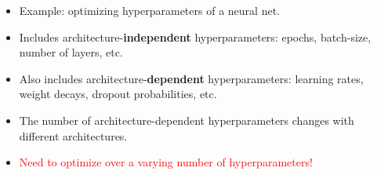 \documentclass[landscape,a0b,final,a4resizeable]{include/a0poster}
\begin{document}
\begin{poster}
\vspace*{4cm}

\large




\begin{multicols}{3}
%

\vspace{0.5in}

\begin{minipage}[c]{0.17\textwidth}
\begin{itemize}
	\item Example: optimizing hyperparameters of a neural net.
	\item Includes architecture-\textbf{independent} hyperparameters: epochs, batch-size, number of layers, etc.
	\item Also includes architecture-\textbf{dependent} hyperparameters: learning rates, weight decays, dropout probabilities, etc.
	\item The number of architecture-dependent hyperparameters changes with different architectures.
	\item \textcolor{red} {Need to optimize over a varying number of hyperparameters!}
\end{itemize}
\end{minipage}
\begin{minipage}[c]{0.15\textwidth}
\begin{centering}
\begin{tabular}{c}
 \\
\end{tabular}
\end{centering}
\end{minipage}


\end{multicols}
\end{poster}
\end{document}
